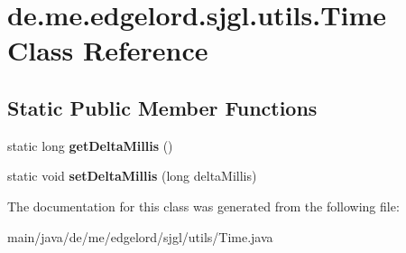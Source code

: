 \hypertarget{classde_1_1me_1_1edgelord_1_1sjgl_1_1utils_1_1_time}{}\section{de.\+me.\+edgelord.\+sjgl.\+utils.\+Time Class Reference}
\label{classde_1_1me_1_1edgelord_1_1sjgl_1_1utils_1_1_time}
\subsection*{Static Public Member Functions}
\begin{DoxyCompactItemize}
\item 
\mbox{\label{classde_1_1me_1_1edgelord_1_1sjgl_1_1utils_1_1_time_a0a146a668b45e47a9d35ef5f355a3879}} 
static long {\bfseries get\+Delta\+Millis} ()
\item 
\mbox{\label{classde_1_1me_1_1edgelord_1_1sjgl_1_1utils_1_1_time_a94ff15d0e5a3c4e88ebcea657395ec71}} 
static void {\bfseries set\+Delta\+Millis} (long delta\+Millis)
\end{DoxyCompactItemize}


The documentation for this class was generated from the following file\+:\begin{DoxyCompactItemize}
\item 
main/java/de/me/edgelord/sjgl/utils/Time.\+java\end{DoxyCompactItemize}
